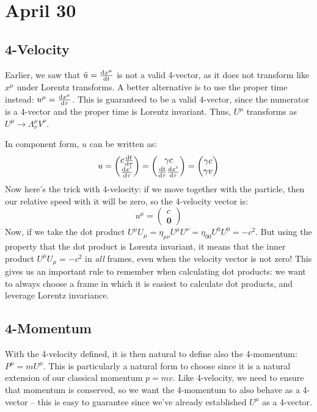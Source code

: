 \section{April 30}
\subsection{4-Velocity}
Earlier, we saw that \( \tilde u = \dv{x^{\mu}}{t} \) is not a valid 4-vector, as it does not transform like
\( x^{\mu} \) under Lorentz transforms.
A better alternative is to use the proper time instead: \( u^{\mu} = \dv{x^{\mu}}{\tau} \). 
This is guaranteed to be a valid 4-vector, since the numerator is a
4-vector and the proper time is Lorentz invariant. Thus, \( U^{\mu} \) transforms as \( U^{\mu} \to
\Lambda^{\mu}_\nu V^{\nu} \).

In component form, \( u \) can be written as:
\[
	u = \begin{pmatrix} c \dv{t}{\tau} \\ \dv{x^{i}}{\tau} \end{pmatrix} = \begin{pmatrix} \gamma c \\
\dv{t}{\tau} \dv{x^{i}}{\tau} \end{pmatrix} = \begin{pmatrix} \gamma c \\ \gamma v \end{pmatrix}
\]
Now here's the trick with 4-velocity: if we move together with the particle, then our relative speed with it
will be zero, so the 4-velocity vector is:
\[
	u^{\mu} = \begin{pmatrix} c \\ \mathbf{0} \end{pmatrix}
\]
Now, if we take the dot product \( U^{\mu}U_{\mu} = \eta_{\mu \nu}U^{\mu}U^{\nu} = \eta_{00} U^{0}U^{0} =
-c^2 \). But using the property that the dot product is Lorentz invariant, it means that the inner product \(
U^{\mu}U_{\mu} = -c^2\)	in \textit{all} frames, even when the velocity vector is not zero! This gives us an
important rule to remember when calculating dot products: we want to always choose a frame in which it is
easiest to calculate dot products, and leverage Lorentz invariance. 

\subsection{4-Momentum}
With the 4-velocity defined, it is then natural to define also the 4-momentum: \( P^{\mu} = m U^{\mu} \).
This is particularly a natural form to choose since it is a natural extension of our classical momentum \( p
= mv \). Like 4-velocity, we need to ensure that momentum is conserved, so we want the 4-momentum to also
behave as a 4-vector -- this is easy to guarantee since we've already established \( U^{\mu} \) as a
4-vector. 

